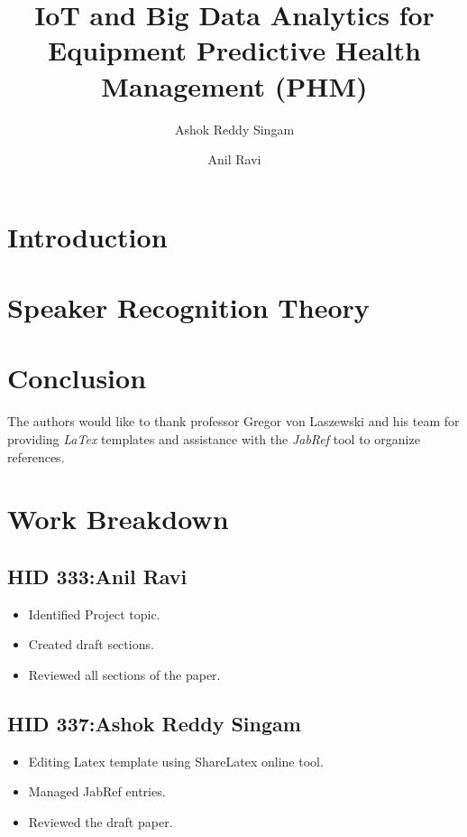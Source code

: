 \documentclass[sigconf]{acmart}
\begin{document}
\title{IoT and Big Data Analytics for Equipment Predictive Health
       Management (PHM)}

\author{Ashok Reddy Singam}

\author{Anil Ravi}

\begin{abstract}

\end{abstract}


\maketitle

\section{Introduction}

\section{Speaker Recognition Theory}

\section{Conclusion}

\begin{acks}

  The authors would like to thank professor Gregor von Laszewski and his team for providing \textit{LaTex} templates and assistance with the \textit{JabRef} tool to organize references.


\end{acks}


 
\newpage
\appendix
\section{Work Breakdown}
\subsection{HID 333:Anil Ravi}
\begin{itemize}
  \item Identified Project topic.
  \item Created draft sections.
  \item Reviewed all sections of the paper.
\end{itemize}
\subsection{HID 337:Ashok Reddy Singam}
\begin{itemize}
  \item Editing Latex template using ShareLatex online tool.
  \item Managed JabRef entries.
  \item Reviewed the draft paper.
\end{itemize}
\end{document}
